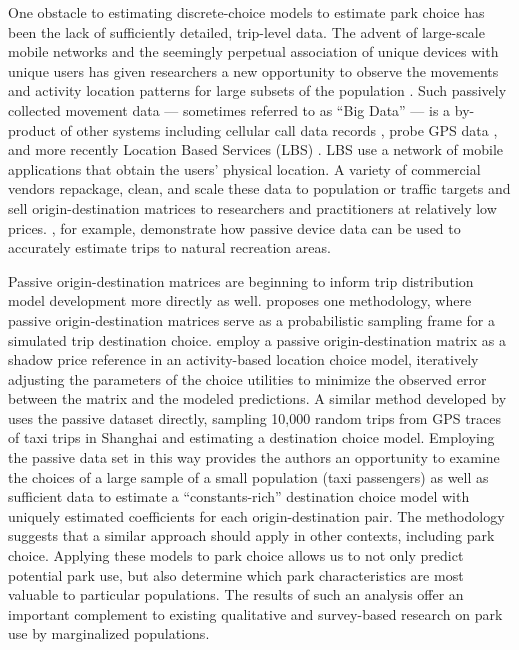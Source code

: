 \documentclass[3p, authoryear]{elsarticle} %
\begin{document}
One obstacle to estimating discrete-choice models to estimate park choice has
been the lack of sufficiently detailed, trip-level data. The advent of
large-scale mobile networks and the seemingly perpetual association of unique
devices with unique users has given researchers a new opportunity to observe the
movements and activity location patterns for large subsets of the population
\citep{Naboulsi2016}. Such passively collected movement data --- sometimes referred
to as ``Big Data'' --- is a by-product of other systems including cellular call
data records \citep[e.g.,][]{Bolla2000, Calabrese2011}, probe GPS data \citep{Huang2015},
and more recently Location Based Services (LBS) \citep{Roll2019, Komanduri2017}. LBS
use a network of mobile applications that obtain the users' physical location. A
variety of commercial vendors repackage, clean, and scale these data to
population or traffic targets and sell origin-destination matrices to
researchers and practitioners at relatively low prices. \citet{Monz2019}, for example,
demonstrate how passive device data can be used to accurately estimate trips to
natural
recreation areas.

Passive origin-destination matrices are beginning to inform trip distribution
model development more directly as well. \citet{tf_idea} proposes one methodology,
where passive origin-destination matrices serve as a probabilistic sampling
frame for a simulated trip destination choice. \citet{Bernardin2018} employ a passive
origin-destination matrix as a shadow price reference in an activity-based
location choice model, iteratively adjusting the parameters of the choice
utilities to minimize the observed error between the matrix and the modeled
predictions. A similar method developed by \citet{Zhu2018} uses the passive dataset
directly, sampling 10,000 random trips from GPS traces of taxi trips in Shanghai
and estimating a destination choice model. Employing the passive data set in
this way provides the authors an opportunity to examine the choices of a large
sample of a small population (taxi passengers) as well as sufficient data to
estimate a ``constants-rich'' destination choice model with uniquely estimated
coefficients for each origin-destination pair. The \citet{Zhu2018} methodology suggests
that a similar approach should apply in other contexts, including park choice.
Applying these models to park choice allows us to not only predict potential
park use, but also determine which park characteristics are most valuable to
particular populations. The results of such an analysis offer an important
complement to existing qualitative and survey-based research on park use by
marginalized populations.
\end{document}
